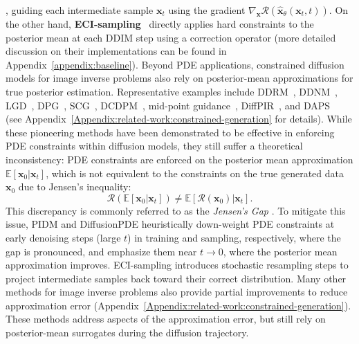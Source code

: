 \documentclass{article}
\theoremstyle{plain}
\theoremstyle{definition}
\theoremstyle{remark}
\def\vx{{\bm{x}}}
\begin{document}
 \cite{chung2022dps}, guiding each intermediate sample $\vx_t$ using the gradient $\nabla_{\vx} \mathcal R(\hat{\vx}_\theta(\vx_t, t))$. On the other hand, \textbf{ECI-sampling}~\cite{cheng2025eci} directly applies hard constraints to the posterior mean at each DDIM step using a correction operator (more detailed discussion on their implementations can be found in Appendix~\ref{appendix:baseline}). Beyond PDE applications, constrained diffusion models for image inverse problems also rely on posterior-mean approximations for true posterior estimation. Representative examples include DDRM~\cite{ddrm}, DDNM~\cite{ddnm}, LGD~\cite{LGD}, DPG~\cite{DPG}, SCG~\cite{scg}, DCDPM~\cite{dcdpm}, mid-point guidance~\cite{midpoint}, DiffPIR~\cite{diffpir}, and DAPS~\cite{daps} (see Appendix~\ref{Appendix:related-work:constrained-generation} for details). While these pioneering methods have been demonstrated to be effective in enforcing PDE constraints within diffusion models, they still suffer a theoretical inconsistency: PDE constraints are enforced on the posterior mean approximation $\mathbb{E}[\vx_0|\vx_t]$, which is not equivalent to the constraints on the true generated data $\vx_0$ due to Jensen's inequality:
\begin{equation}
\mathcal{R}(\mathbb{E}[\vx_0|\vx_t]) \neq \mathbb{E}[\mathcal{R}(\vx_0)|\vx_t].
\end{equation}
This discrepancy is commonly referred to as the \textit{Jensen's Gap} \cite{chung2022dps, bastek2025pdim, huang2024diffusionpde, gao2017jensen}. To mitigate this issue, PIDM and DiffusionPDE heuristically down-weight PDE constraints at early denoising steps (large $t$) in training and sampling, respectively, where the gap is pronounced, and emphasize them near $t \to 0$, where the posterior mean approximation improves. ECI-sampling introduces stochastic resampling steps \cite{wang2025resample} to project intermediate samples back toward their correct distribution. Many other methods for image inverse problems also provide partial improvements to reduce approximation error \cite{LGD, DPG, scg, dcdpm, midpoint} (Appendix~\ref{Appendix:related-work:constrained-generation}). These methods address aspects of the approximation error, but still rely on posterior-mean surrogates during the diffusion trajectory.

\end{document}
